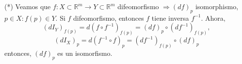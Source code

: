 \begin{sol}
  (*) Veamos que $f : X \subset \mathbb{R}^{m} \to  Y \subset \mathbb{R}^{m}$ difeomorfismo $\Rightarrow (d f)_{p}$ isomorphismo, $p \in X : f(p) \in Y$. Si $f$ difeomorfismo, entonces $f$ tiene inversa $f^{-1}$. Ahora, 
\[ 
  (d I_{Y})_{f(p)} = d(f \circ f^{-1})_{f(p)} = (d f)_{p} \circ (d f^{-1})_{f(p)},
\] 
\[ 
  (d I_{X})_{p} = d(f^{-1} \circ f)_{p} = (d f^{-1})_{f(p)} \circ (d f)_{p} 
\] 
entonces, $(d f)_{p}$ es un isomorfismo.
\end{sol}
